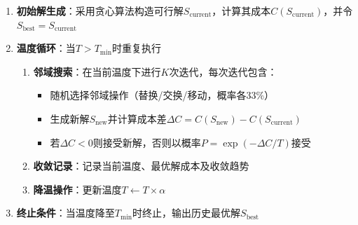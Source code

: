 \documentclass{ctexart}
\begin{document}
\begin{enumerate}
\begin{enumerate}
        \item \textbf{初始解生成}：采用贪心算法构造可行解$S_{\text{current}}$，计算其成本$C(S_{\text{current}})$，并令$S_{\text{best}}=S_{\text{current}}$
        
        \item \textbf{温度循环}：当$T > T_{\min}$时重复执行
        \begin{enumerate}
            \item \textbf{邻域搜索}：在当前温度下进行$K$次迭代，每次迭代包含：
            \begin{itemize}
                \item 随机选择邻域操作（替换/交换/移动，概率各33\%）
                \item 生成新解$S_{\text{new}}$并计算成本差$\Delta C = C(S_{\text{new}}) - C(S_{\text{current}})$
                \item 若$\Delta C < 0$则接受新解，否则以概率$P=\exp(-\Delta C / T)$接受
            \end{itemize}
            
            \item \textbf{收敛记录}：记录当前温度、最优解成本及收敛趋势
            
            \item \textbf{降温操作}：更新温度$T \leftarrow T \times \alpha$
        \end{enumerate}
        
        \item \textbf{终止条件}：当温度降至$T_{\min}$时终止，输出历史最优解$S_{\text{best}}$
    \end{enumerate}
\end{enumerate}
\end{document}
